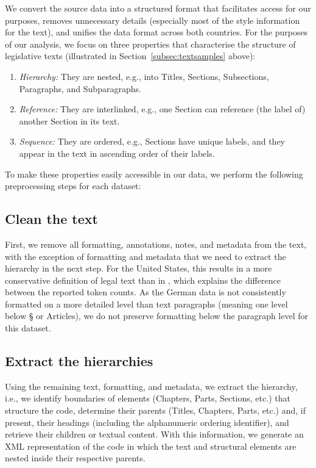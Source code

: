 We convert the source data into a structured format that facilitates access for our purposes, 
removes unnecessary details (especially most of the style information for the text),
and unifies the data format across both countries. 
For the purposes of our analysis, 
we focus on three properties that characterise the structure of legislative texts (illustrated in Section~\ref{subsec:textsamples} above):

\begin{enumerate}
	\item \emph{Hierarchy:} They are nested, e.g., into Titles, Sections, Subsections, Paragraphs, and Subparagraphs.
	\item \emph{Reference:} They are interlinked, e.g., one Section can reference (the label of) another Section in its text.
	\item \emph{Sequence:} They are ordered, e.g., Sections have unique labels, and they appear in the text in ascending order of their labels.
\end{enumerate}

To make these properties easily accessible in our data, 
we perform the following preprocessing steps for each dataset:

\subsection{Clean the text}

First, we remove all formatting, annotations, notes, and metadata from the text, 
with the exception of formatting and metadata that we need to extract the hierarchy in the next step. 
For the United States, this results in a more conservative definition of legal text than in \cite{bommarito2010a}, which explains the difference between the reported token counts.
As the German data is not consistently formatted on a more detailed level than text paragraphs (meaning one level below § or Articles), we do not preserve formatting below the paragraph level for this dataset.

\subsection{Extract the hierarchies}

Using the remaining text, formatting, and metadata, 
we extract the hierarchy, i.e., 
we identify boundaries of elements (Chapters, Parts, Sections, etc.) that structure the code, 
determine their parents (Titles, Chapters, Parts, etc.) and, 
if present, their headings (including the alphanumeric ordering identifier), 
and retrieve their children or textual content. 
With this information, 
we generate an XML representation of the code 
in which the text and structural elements are nested inside their respective parents. 

